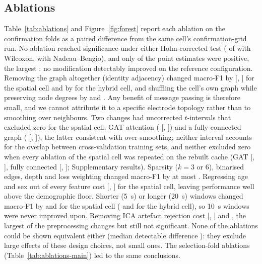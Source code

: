 \subsection{Ablations}\label{sec:res-ablations}
Table~\ref{tab:ablations} and Figure~\ref{fig:forest} report each ablation on the confirmation folds
as a paired difference from the same cell's confirmation-grid run. No ablation reached significance
under either Holm-corrected test (\cablNSigWil{} of \cablN{} with Wilcoxon, \cablNSigNb{} with
Nadeau--Bengio), and only \cablNPos{} of the \cablN{} point estimates were positive, the largest
\cablPosMax{}: no modification detectably improved on the reference configuration. Removing the graph altogether (identity adjacency) changed
macro-F1 by \cablPThreespatialAOnenographDelta{} [\cablPThreespatialAOnenographLo{},
\cablPThreespatialAOnenographHi{}] for the spatial cell and by \cablPThreehybridAOnenographDelta{}
for the hybrid cell, and shuffling the cell's own graph while preserving node degrees by \cablPThreespatialATworandomgraphDelta{} and \cablPThreehybridATworandomgraphDelta{}. Any benefit of message passing is therefore small, and
we cannot attribute it to a specific electrode topology rather than to smoothing over neighbours.
Two changes had uncorrected $t$-intervals that excluded zero for the spatial cell: GAT attention
(\cablPThreespatialASixgatDelta{} [\cablPThreespatialASixgatLo{}, \cablPThreespatialASixgatHi{}]) and a
fully connected graph (\cablPThreespatialAThreefullDelta{} [\cablPThreespatialAThreefullLo{},
\cablPThreespatialAThreefullHi{}]), the latter consistent with over-smoothing; neither interval accounts for the overlap between cross-validation training sets, and neither excluded zero when every ablation of the spatial cell was repeated on the rebuilt cache (GAT \rbGat{} [\rbGatLo{}, \rbGatHi{}], fully connected \rbFull{} [\rbFullLo{}, \rbFullHi{}]; Supplementary results). Sparsity ($k=3$ or 6), binarised
edges, depth and loss weighting changed macro-F1 by at most \cablSmallMax{}. Regressing age and sex out of
every feature cost \cablPThreespatialAOneTworesidualizedDelta{} [\cablPThreespatialAOneTworesidualizedLo{},
\cablPThreespatialAOneTworesidualizedHi{}] for the spatial cell, leaving performance well above the
demographic floor. Shorter (\SI{5}{\second}) or longer (\SI{20}{\second}) windows changed macro-F1 by
\cablPThreespatialASevenwindowFiveDelta{} and \cablPThreespatialASevenwindowTwoZeroDelta{} for the spatial
cell (\cablPThreehybridASevenwindowFiveDelta{} and \cablPThreehybridASevenwindowTwoZeroDelta{} for the
hybrid cell), so \SI{10}{\second} windows were never improved upon. Removing ICA artefact rejection
cost \cablPThreespatialAEightnoicaDelta{} [\cablPThreespatialAEightnoicaLo{},
\cablPThreespatialAEightnoicaHi{}] and \cablPThreehybridAEightnoicaDelta{}, the largest of the
preprocessing changes but still not significant. None of the ablations could be shown equivalent
either (median detectable difference \eqAblMde{}): they exclude large effects of these design choices,
not small ones. The selection-fold ablations
(Table~\ref{tab:ablations-main}) led to the same conclusions.

